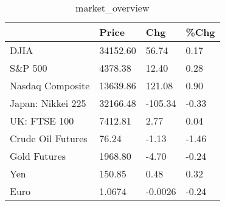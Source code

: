 \documentclass{article}%
\begin{document}
%


\begin{table}[htbp]%
\caption{market\_overview}%
\centering%
\begin{adjustbox}{width=1\textwidth}%
\begin{tabular}{llll}
\toprule
                  &    Price &     Chg &  \%Chg \\
\midrule
             DJIA & 34152.60 &   56.74 &  0.17 \\
          S\&P 500 &  4378.38 &   12.40 &  0.28 \\
 Nasdaq Composite & 13639.86 &  121.08 &  0.90 \\
Japan: Nikkei 225 & 32166.48 & -105.34 & -0.33 \\
     UK: FTSE 100 &  7412.81 &    2.77 &  0.04 \\
Crude Oil Futures &    76.24 &   -1.13 & -1.46 \\
     Gold Futures &  1968.80 &   -4.70 & -0.24 \\
              Yen &   150.85 &    0.48 &  0.32 \\
             Euro &   1.0674 & -0.0026 & -0.24 \\
\bottomrule
\end{tabular}
%
\end{adjustbox}%
\end{table}

%
\end{document}
